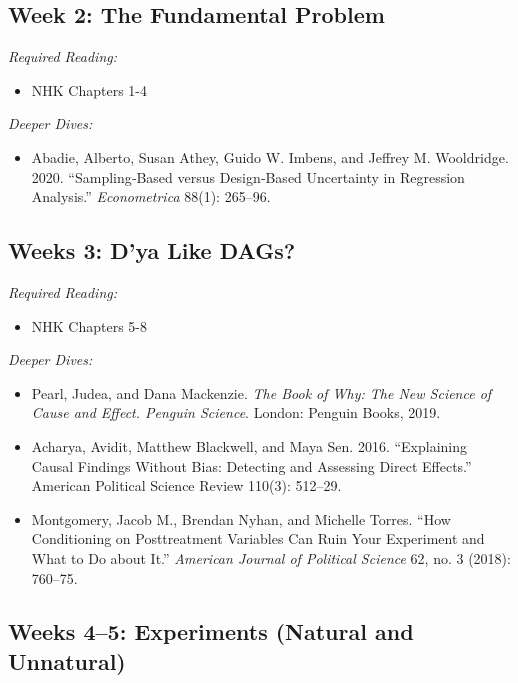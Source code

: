 \documentclass[11pt, letterpaper]{article}
\begin{document}
\subsection*{Week 2: The Fundamental Problem}

\textit{Required Reading:}

\begin{itemize}
	\item NHK Chapters 1-4
\end{itemize}

\noindent \textit{Deeper Dives:}

\begin{itemize}
	\item Abadie, Alberto, Susan Athey, Guido W. Imbens, and Jeffrey M. Wooldridge. 2020. ``Sampling‐Based versus Design‐Based Uncertainty in Regression Analysis.'' \textit{Econometrica} 88(1): 265–96.
\end{itemize}

\subsection*{Weeks 3: D'ya Like DAGs?}

\textit{Required Reading:}

\begin{itemize}
	\item NHK Chapters 5-8
\end{itemize}

\noindent \textit{Deeper Dives:}

\begin{itemize}
	\item Pearl, Judea, and Dana Mackenzie. \textit{The Book of Why: The New Science of Cause and Effect. Penguin Science}. London: Penguin Books, 2019.
	\item Acharya, Avidit, Matthew Blackwell, and Maya Sen. 2016. ``Explaining Causal Findings Without Bias: Detecting and Assessing Direct Effects.'' American Political Science Review 110(3): 512–29.
	\item Montgomery, Jacob M., Brendan Nyhan, and Michelle Torres. ``How Conditioning on Posttreatment Variables Can Ruin Your Experiment and What to Do about It.'' \textit{American Journal of Political Science} 62, no. 3 (2018): 760–75.
\end{itemize}

\subsection*{Weeks 4--5: Experiments (Natural and Unnatural)}
\end{document}
